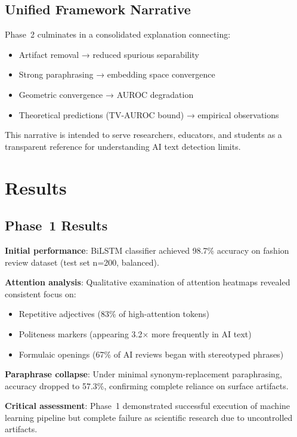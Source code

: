 \documentclass[conference]{IEEEtran}
\begin{document}
\subsection{Unified Framework Narrative}

Phase~2 culminates in a consolidated explanation connecting:
\begin{itemize}
    \item Artifact removal → reduced spurious separability
    \item Strong paraphrasing → embedding space convergence
    \item Geometric convergence → AUROC degradation
    \item Theoretical predictions (TV-AUROC bound) → empirical observations
\end{itemize}

This narrative is intended to serve researchers, educators, and students as a transparent reference for understanding AI text detection limits.

\section{Results}

\subsection{Phase~1 Results}

\textbf{Initial performance}: BiLSTM classifier achieved 98.7\% accuracy on fashion review dataset (test set n=200, balanced).

\textbf{Attention analysis}: Qualitative examination of attention heatmaps revealed consistent focus on:
\begin{itemize}
    \item Repetitive adjectives (83\% of high-attention tokens)
    \item Politeness markers (appearing 3.2× more frequently in AI text)
    \item Formulaic openings (67\% of AI reviews began with stereotyped phrases)
\end{itemize}

\textbf{Paraphrase collapse}: Under minimal synonym-replacement paraphrasing, accuracy dropped to 57.3\%, confirming complete reliance on surface artifacts.

\textbf{Critical assessment}: Phase~1 demonstrated successful execution of machine learning pipeline but complete failure as scientific research due to uncontrolled artifacts.
\end{document}
